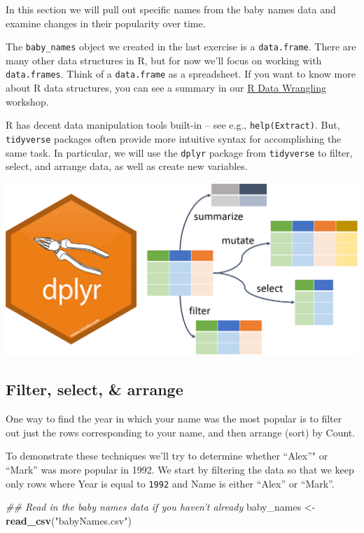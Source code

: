 \documentclass[
]{book}
\newenvironment{Shaded}{\begin{snugshade}}{\end{snugshade}}
\newcommand{\CommentTok}[1]{\textcolor[rgb]{0.56,0.35,0.01}{\textit{#1}}}
\newcommand{\KeywordTok}[1]{\textcolor[rgb]{0.13,0.29,0.53}{\textbf{#1}}}
\newcommand{\NormalTok}[1]{#1}
\newcommand{\StringTok}[1]{\textcolor[rgb]{0.31,0.60,0.02}{#1}}
\begin{document}
In this section we will pull out specific names from the baby names data and examine changes in
their popularity over time.

The \texttt{baby\_names} object we created in the last exercise is a \texttt{data.frame}.
There are many other data structures in R, but for now we'll focus on
working with \texttt{data.frames}. Think of a \texttt{data.frame} as a spreadsheet.
If you want to know more about R data structures, you can see a summary
in our \href{./RDataWrangling.html\#data-types-and-structures}{R Data Wrangling} workshop.

R has decent data manipulation tools built-in -- see e.g.,
\texttt{help(Extract)}. But, \texttt{tidyverse} packages often provide
more intuitive syntax for accomplishing the same task. In
particular, we will use the \texttt{dplyr} package from \texttt{tidyverse}
to filter, select, and arrange data, as well as create new variables.

\includegraphics{R/Rintro/images/dplyr.png}

\hypertarget{filter-select-arrange}{%
\subsection{Filter, select, \& arrange}\label{filter-select-arrange}}

One way to find the year in which your name was the most popular
is to filter out just the rows corresponding to your name, and
then arrange (sort) by Count.

To demonstrate these techniques we'll try to determine whether
``Alex''" or ``Mark'' was more popular in 1992. We start by filtering the
data so that we keep only rows where Year is equal to \texttt{1992} and Name is
either ``Alex'' or ``Mark''.

\begin{Shaded}
\begin{Highlighting}[]
\CommentTok{## Read in the baby names data if you haven't already}
\NormalTok{baby_names <-}\StringTok{ }\KeywordTok{read_csv}\NormalTok{(}\StringTok{"babyNames.csv"}\NormalTok{)}
\end{Highlighting}
\end{Shaded}
\end{document}

